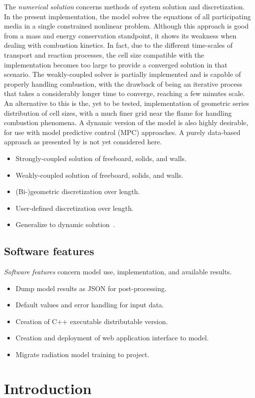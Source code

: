 \documentclass[11pt]{paper}
\newcommand{\openitem}{\item[$\square$]}
\newcommand{\markitem}{\item[$\boxtimes$]}
\begin{document}
The \emph{numerical solution} concerns methods of system solution and discretization. In the present implementation, the model solves the equations of all participating media in a single constrained nonlinear problem. Although this approach is good from a mass and energy conservation standpoint, it shows its weakness when dealing with combustion kinetics. In fact, due to the different time-scales of transport and reaction processes, the cell size compatible with the implementation becomes too large to provide a converged solution in that scenario. The weakly-coupled solver is partially implemented and is capable of properly handling combustion, with the drawback of being an iterative process that takes a considerably longer time to converge, reaching a few minutes scale. An alternative to this is the, yet to be tested, implementation of geometric series distribution of cell sizes, with a much finer grid near the flame for handling combustion phenomena. A dynamic version of the model is also highly desirable, for use with model predictive control (MPC) approaches. A purely data-based approach as presented by \textcite{Wurzinger2019} is not yet considered here.

\begin{itemize}
\markitem Strongly-coupled solution of freeboard, solids, and walls.
\openitem Weakly-coupled solution of freeboard, solids, and walls.
\openitem (Bi-)geometric discretization over length.
\openitem User-defined discretization over length.
\openitem Generalize to dynamic solution~\cite{Stadler2011,Sun2020}.
\end{itemize}

\subsection*{Software features}

\emph{Software features} concern model use, implementation, and available results.

\begin{itemize}
\markitem Dump model results as {JSON} for post-processing.
\openitem Default values and error handling for input data.
\openitem Creation of C++ executable distributable version.
\openitem Creation and deployment of web application interface to model.
\openitem Migrate radiation model training to project.
\end{itemize}

\onehalfspacing%
\clearpage%
\tableofcontents%
\clearpage%

\section*{Introduction}
\end{document}
